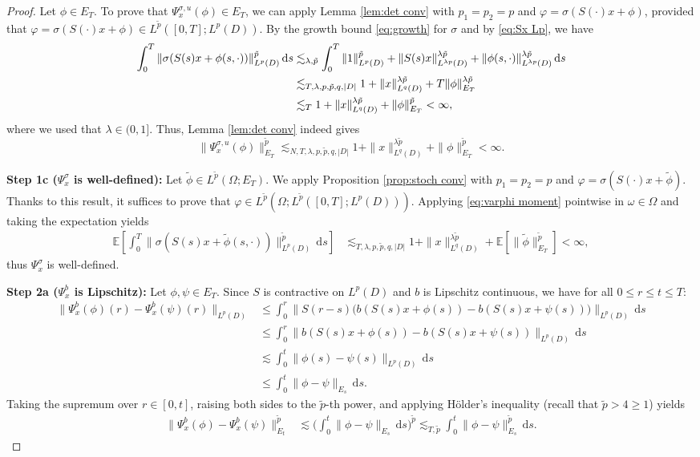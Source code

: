 \documentclass[10pt,a4paper]{amsart}
\numberwithin{equation}{section}
\newcommand{\E}{{\mathbb E}}
\newcommand{\Om}{\Omega}
\newcommand{\om}{\omega}
\newcommand{\dd}{\,\mathrm{d}}
\begin{document}
\begin{proof}
Let $\phi\in E_T$. To prove that $\Psi_x^{\sigma,u}(\phi)\in E_T$, we can apply Lemma \ref{lem:det conv}  with $p_1=p_2=p$ and $\varphi=\sigma(S(\cdot)x+\phi)$, provided that $\varphi =\sigma(S(\cdot)x+\phi)\in  L^{\tilde p}( [0,T];L^p(D))$. By the growth bound \eqref{eq:growth} for $\sigma$ and by \eqref{eq:Sx Lp}, we have
\begin{align}\label{eq:varphi moment} 
\int_0^T \|\sigma(S(s)x+\phi(s,\cdot))\|_{L^p(D)}^{\tilde p}\dd s
&\lesssim_{\lambda,\tilde p} \int_0^T \|1\|_{L^p(D)}^{\tilde p}+ \|S(s)x\|_{L^{\lambda p}(D)}^{\lambda \tilde p}+ \|\phi(s,\cdot)\|_{L^{\lambda p}(D)}^{\lambda \tilde p}\dd s\notag\\
&\lesssim_{T,\lambda,p,\tilde p,q,|D|} 1+\|x\|_{L^q(D)}^{\lambda\tilde p}+T\|\phi \|_{E_T}^{\lambda \tilde p}\notag\\
&\lesssim_T 1+\|x\|_{L^q(D)}^{\lambda\tilde p}+\|\phi \|_{E_T}^{\tilde p}<\infty,  
\end{align}
where we used that $\lambda\in(0,1]$. 
Thus, Lemma \ref{lem:det conv} indeed gives  
\[
\|\Psi_x^{\sigma,u}(\phi)\|_{E_T}^{\tilde p}\lesssim_{N,T,\lambda,p,\tilde p,q,|D|} 1+\|x\|_{L^q(D)}^{\lambda\tilde p}+\|\phi \|_{E_T}^{\tilde p} <\infty. 
\]

\textbf{Step 1c ($\Psi_x^\sigma$ is well-defined):} 
Let $\tilde\phi\in L^{\tilde p}(\Om;E_T)$. 
We apply Proposition \ref{prop:stoch conv}  with $p_1=p_2=p$ and    $\varphi=\sigma(S(\cdot)x+\tilde\phi)$. Thanks to this result, it suffices to prove that $\varphi\in L^{\tilde p}(\Om;L^{\tilde p}( [0,T];L^p(D)))$. 
Applying \eqref{eq:varphi moment} pointwise in $\om\in\Om$ and taking the expectation yields 
\begin{align}\label{eq:varphi moment 2}
\E[\int_0^T \|\sigma(S(s)x+\tilde\phi(s,\cdot))\|_{L^p(D)}^{\tilde p}\dd s]
&\lesssim_{T,\lambda,p,\tilde p,q,|D|}   1+\|x\|_{L^q(D)}^{\lambda\tilde p}+ \E[\|\tilde\phi \|_{E_T}^{\tilde p}]
<\infty,  
\end{align} 
thus $\Psi_x^\sigma$ is well-defined.   

\textbf{Step 2a ($\Psi_x^b$ is Lipschitz):}
Let $\phi,\psi\in E_T$. 
Since $S$ is contractive  on $L^p(D)$ and $b$ is Lipschitz continuous, we have  for all $0\leq r\leq t\leq T$:
\begin{align*}
\|\Psi_x^b(\phi)(r)-\Psi_x^b(\psi)(r)\|_{L^p(D)}
&\leq \int_0^r \big\| S(r-s) \big( b(S(s)x+\phi(s))-b(S(s)x+\psi(s)) \big) \big\|_{L^p(D)} \dd s \\
&\leq \int_0^r \| b(S(s)x+\phi(s))-b(S(s)x+\psi(s)) \|_{L^p(D)} \dd s \\
&\lesssim \int_0^t \| \phi(s)-\psi(s) \|_{L^p(D)} \dd s\\
&\leq \int_0^t \| \phi-\psi \|_{E_s} \dd s.
\end{align*} 
Taking the supremum over   $r \in [0,t]$, raising both sides to the $\tilde p$-th power, and applying H\"older's inequality (recall that $\tilde p>4 \geq 1$) yields
\begin{align*}
\|\Psi_x^b(\phi)-\Psi_x^b(\psi)\|_{E_t}^{\tilde p}
&\lesssim \Big(\int_0^t \| \phi-\psi \|_{E_s} \dd s\Big)^{\tilde p}\lesssim_{T,\tilde p}\int_0^t \| \phi-\psi \|_{E_s}^{\tilde p} \dd s.
\end{align*}



\end{proof}
\end{document}
